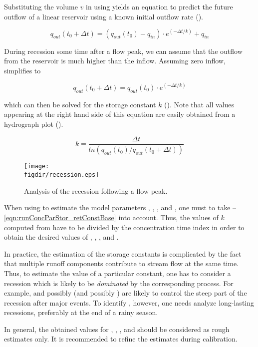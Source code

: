 Substituting the volume $v$ in  using  yields an equation to predict the future outflow of a linear reservoir using a known initial outflow rate ().

\begin{equation} \label{eqn:runConcParStor_linResSolution_flow}
  q_{out}(t_0 + \Delta t) =  (q_{out}(t_0) - q_{in}) \cdot e^{(-\Delta t / k)} + q_{in}
\end{equation}

During recession some time after a flow peak, we can assume that the outflow from the reservoir is much higher than the inflow. Assuming zero inflow,  simplifies to 

\begin{equation} \label{eqn:runConcParStor_linResSolution_flow_zeroInput}
  q_{out}(t_0 + \Delta t) =  q_{out}(t_0) \cdot e^{(-\Delta t / k)}
\end{equation}

which can then be solved for the storage constant $k$ (). Note that all values appearing at the right hand side of this equation are easily obtained from a hydrograph plot ().

\begin{equation} \label{eqn:runConcParStor_kEstim}
  k = \frac{\Delta t}{ln(q_{out}(t_0) / q_{out}(t_0 + \Delta t))}
\end{equation}

\begin{figure}
  \centering
  \texttt{[image: \\figdir/recession.eps]}
  \caption{Analysis of the recession following a flow peak. \label{fig:runConcParStor_recession}}
\end{figure}

When using  to estimate the model parameters \strSurf{}, \strPref{}, \strInter{}, and \strBase{}, one must to take --\ref{eqn:runConcParStor_retConstBase} into account. Thus, the values of $k$ computed from  have to be divided by the concentration time index \concTimeIndex{} in order to obtain the desired values of \strSurf{}, \strPref{}, \strInter{}, and \strBase{}.

In practice, the estimation of the storage constants is complicated by the fact that multiple runoff components contribute to stream flow at the same time. Thus, to estimate the value of a particular constant, one has to consider a recession which is likely to be \emph{dominated} by the corresponding process. For example, \strPref{} and possibly \strSurf{} (and possibly \strInter{}) are likely to control the steep part of the recession after major events. To identify \strBase{}, however, one needs analyze long-lasting recessions, preferably at the end of a rainy season. 

In general, the obtained values for \strSurf{}, \strPref{}, \strInter{}, and \strBase{} should be considered as rough estimates only. It is recommended to refine the estimates during calibration.

